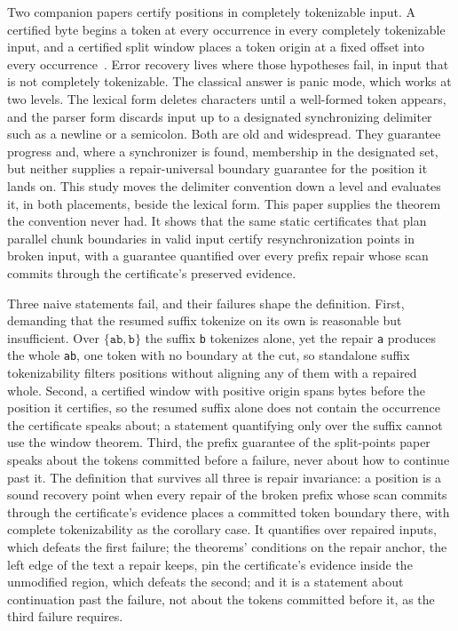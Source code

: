 \documentclass[11pt,a4paper]{article}
\theoremstyle{definition}
\theoremstyle{plain}
\theoremstyle{remark}
\newcommand{\code}[1]{\texttt{#1}}
\begin{document}
Two companion papers certify positions in completely tokenizable input. A certified byte begins a token at every
occurrence in every completely tokenizable input, and a certified split window places a token origin at a fixed offset
into every occurrence~\citep{splitpoints2026, splitwindows2026}. Error recovery lives where those hypotheses fail, in
input that is not completely tokenizable. The classical answer is panic mode, which works at two levels. The lexical
form deletes characters until a well-formed token appears, and the parser form discards input up to a designated
synchronizing delimiter such as a newline or a semicolon. Both are old and widespread. They guarantee progress and,
where a synchronizer is found, membership in the designated set, but neither supplies a repair-universal boundary
guarantee for the position it lands on. This study moves the delimiter convention down a level and evaluates it, in both
placements, beside the lexical form. This paper supplies the theorem the convention never had. It shows that the same
static certificates that plan parallel chunk boundaries in valid input certify resynchronization points in broken input,
with a guarantee quantified over every prefix repair whose scan commits through the certificate's preserved evidence.

Three naive statements fail, and their failures shape the definition. First, demanding that the resumed suffix tokenize
on its own is reasonable but insufficient. Over $\{\code{ab}, \code{b}\}$ the suffix \code{b} tokenizes alone, yet the
repair \code{a} produces the whole \code{ab}, one token with no boundary at the cut, so standalone suffix tokenizability
filters positions without aligning any of them with a repaired whole. Second, a certified window with positive origin
spans bytes before the position it certifies, so the resumed suffix alone does not contain the occurrence the
certificate speaks about; a statement quantifying only over the suffix cannot use the window theorem. Third, the prefix
guarantee of the split-points paper speaks about the tokens committed before a failure, never about how to continue past
it. The definition that survives all three is repair invariance: a position is a sound recovery point when every repair
of the broken prefix whose scan commits through the certificate's evidence places a committed token boundary there, with
complete tokenizability as the corollary case. It quantifies over repaired inputs, which defeats the first failure; the
theorems' conditions on the repair anchor, the left edge of the text a repair keeps, pin the certificate's evidence
inside the unmodified region, which defeats the second; and it is a statement about continuation past the failure, not
about the tokens committed before it, as the third failure requires.
\end{document}
